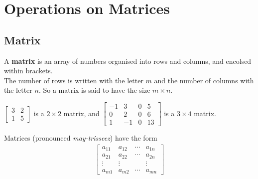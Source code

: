 \documentclass[../notes.tex]{subfiles}
\begin{document}
		\section{Operations on Matrices}
			\subsection{Matrix}
				A \textbf{matrix} is an array of numbers organised into rows and columns, and encolsed within brackets.\\
				The number of rows is written with the letter $m$ and the number of columns with the letter $n$. So a matrix is said to have the size $m \times n$.
				\begin{example}
					$\begin{bmatrix}
						3 & 2\\
						1 & 5
					\end{bmatrix}$ is a $2 \times 2$ matrix, and
					$\begin{bmatrix}
						-1 & 3 & 0 & 5\\
						0 & 2 & 0 & 6\\
						1 & - 1& 0 & 13
					\end{bmatrix}$ is a $3 \times 4$ matrix.
				\end{example}
				Matrices (pronounced \textit{may-trisseez}) have the form 
				\begin{align*}
					\begin{bmatrix}
						a_{11} & a_{12} & \cdots & a_{1n}\\
						a_{21} & a_{22} & \cdots & a_{2n}\\
						\vdots & \vdots & & \vdots\\
						a_{m1} & a_{m2} & \cdots & a_{mn}
					\end{bmatrix}
				\end{align*}
\end{document}
